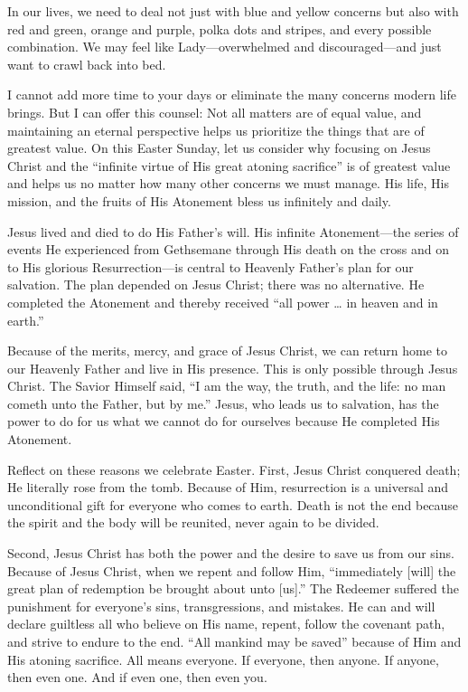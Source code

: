 \documentclass[letterpaper, 11pt]{report}
\begin{document}
In our lives, we need to deal not just with blue and yellow concerns but also with red and green, orange and purple, polka dots and stripes, and every possible combination. We may feel like Lady—overwhelmed and discouraged—and just want to crawl back into bed.

I cannot add more time to your days or eliminate the many concerns modern life brings. But I can offer this counsel: Not all matters are of equal value, and maintaining an eternal perspective helps us prioritize the things that are of greatest value. On this Easter Sunday, let us consider why focusing on Jesus Christ and the “infinite virtue of His great atoning sacrifice” is of greatest value and helps us no matter how many other concerns we must manage. His life, His mission, and the fruits of His Atonement bless us infinitely and daily.

Jesus lived and died to do His Father’s will. His infinite Atonement—the series of events He experienced from Gethsemane through His death on the cross and on to His glorious Resurrection—is central to Heavenly Father’s plan for our salvation. The plan depended on Jesus Christ; there was no alternative. He completed the Atonement and thereby received “all power … in heaven and in earth.”

Because of the merits, mercy, and grace of Jesus Christ, we can return home to our Heavenly Father and live in His presence. This is only possible through Jesus Christ. The Savior Himself said, “I am the way, the truth, and the life: no man cometh unto the Father, but by me.” Jesus, who leads us to salvation, has the power to do for us what we cannot do for ourselves because He completed His Atonement.

Reflect on these reasons we celebrate Easter. First, Jesus Christ conquered death; He literally rose from the tomb. Because of Him, resurrection is a universal and unconditional gift for everyone who comes to earth. Death is not the end because the spirit and the body will be reunited, never again to be divided.

Second, Jesus Christ has both the power and the desire to save us from our sins. Because of Jesus Christ, when we repent and follow Him, “immediately [will] the great plan of redemption be brought about unto [us].” The Redeemer suffered the punishment for everyone’s sins, transgressions, and mistakes. He can and will declare guiltless all who believe on His name, repent, follow the covenant path, and strive to endure to the end. “All mankind may be saved” because of Him and His atoning sacrifice. All means everyone. If everyone, then anyone. If anyone, then even one. And if even one, then even you.
\end{document}
